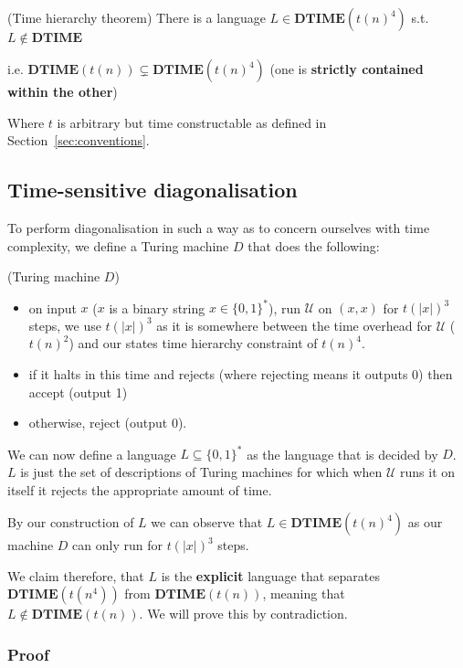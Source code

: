 \documentclass{article}
\begin{document}
\begin{theorem}(Time hierarchy theorem)
  There is a language $L\in \mathbf{\mathbf{DTIME}}(t(n)^{4})$ s.t. $L \notin \mathbf{\mathbf{DTIME}}$

  i.e. $\mathbf{DTIME}(t(n)) \subsetneq \mathbf{DTIME}(t(n)^{4})$ (one is \textbf{strictly contained within the other})

  Where $t$ is arbitrary but time constructable as defined in Section~\ref{sec:conventions}.
\end{theorem}

\subsection{Time-sensitive diagonalisation}
\label{subsec:ts-diagonalisation}

To perform diagonalisation in such a way as to concern ourselves with time complexity, we define a Turing machine $D$ that does the following:
\begin{definition}(Turing machine $D$)
  \label{def:D}
\begin{itemize}
  \item on input $x$ ($x$ is a binary string $x \in \{ 0,1 \}^*$), run $\mathcal{U}$ on $(x,x)$ for $t(|x|)^{3}$ steps, we use $t(|x|)^{3}$ as it is somewhere between the time overhead for $\mathcal{U}$ ($t(n)^{2}$) and our states time hierarchy constraint of $t(n)^{4}$.
  \item if it halts in this time and rejects (where rejecting means it outputs 0) then accept (output 1)
  \item otherwise, reject (output 0).
\end{itemize}

\end{definition}

We can now define a language $L \subseteq \{ 0,1 \}^*$ as the language that is decided by $D$. $L$ is just the set of descriptions of Turing machines for which when $\mathcal{U}$ runs it on itself it rejects the appropriate amount of time.

By our construction of $L$ we can observe that $L \in \mathbf{DTIME}(t(n)^{4})$ as our machine $D$ can only run for $t(|x|)^{3}$ steps.

We claim therefore, that $L$ is the \textbf{explicit} language that separates $\mathbf{DTIME}(t(n^{4}))$ from $\mathbf{DTIME}(t(n))$, meaning that $L \notin \mathbf{DTIME}(t(n))$. We will prove this by contradiction.

\subsubsection{Proof}
\end{document}
